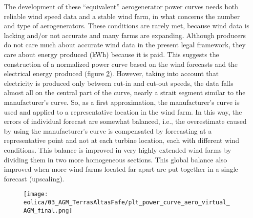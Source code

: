 \begin{figure}[!htp]
    \centering
    \label{fig:powercurve_quad}
\end{figure}
\FloatBarrier

The development of these ``equivalent'' aerogenerator power curves needs both reliable wind speed data and a stable wind farm, in what concerns the number and type of aerogenerators. These conditions are rarely met, because wind data is lacking and/or not accurate and many farms are expanding. Although producers do not care much about accurate wind data in the present legal framework, they care about energy produced (kWh) because it is paid. This suggests the construction of a normalized power curve based on the wind forecasts and the electrical energy produced (figure \ref{fig:powercurve_fcst}). However, taking into account that electricity is produced only between cut-in and cut-out speeds, the data falls almost all on the central part of the curve, nearly a strait segment similar to the manufacturer's curve. So, as a first approximation, the manufacturer's curve is used and applied to a representative location in the wind farm. In this way, the errors of individual forecast are somewhat balanced, i.e., the overestimate caused by using the manufacturer's curve is compensated by forecasting at a representative point and not at each turbine location, each with different wind conditions. This balance is improved in very highly extended wind farms by dividing them in two more homogeneous sections. This global balance also improved when more wind farms located far apart are put together in a single forecast (upscaling).

\begin{figure}[!htp]
    \centering
    \texttt{[image: eolica/03\_AGM\_TerrasAltasFafe/plt\_power\_curve\_aero\_virtual\_AGM\_final.png]}
    \label{fig:powercurve_fcst}
\end{figure}
\FloatBarrier

